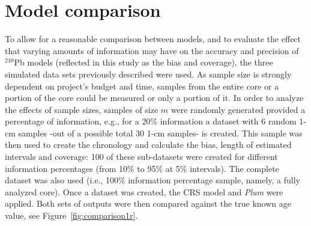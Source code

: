 \documentclass [10pt] {article}
\newcommand{\ac}{\color{red} }  %
\newcommand{\ca}{\color{black}} %
\begin{document}
\section{Model comparison}

To allow for a reasonable comparison between models, and to evaluate the effect that varying amounts of information may have on the accuracy and precision of $^{210}$Pb models (reflected in this study as the bias and coverage), the three simulated data sets previously described were used. 
As sample size is strongly dependent on project's budget and time, samples from the entire core or a portion of the core could be measured or only a portion of it.
In order to analyze the effects of sample sizes, samples of size $m$ were randomly generated provided a percentage of information, e.g., for a 20\% information a dataset with 6 random 1-cm samples -out of a possible total 30 1-cm samples- is created.
This sample was then used to create the chronology and calculate the bias, length of estimated intervals and coverage:
100 of these sub-datasets were created for different information percentages (from 10\% to 95\% at 5\% intervals). 
The complete dataset was also used (i.e., 100\% information percentage sample, namely, a fully analyzed core).
Once a dataset was created, the CRS model and \textit{Plum} were applied. %
Both sets of outputs were then compared against the true known age value, see Figure~\ref{fig:comparison1r}.
\end{document}
